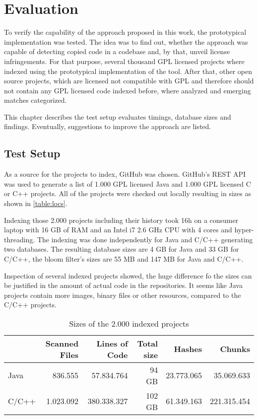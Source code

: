 
\chapter{Evaluation}\label{chapter:evaluation}
To verify the capability of the approach proposed in this work, the prototypical implementation was tested.
The idea was to find out, whether the approach was capable of detecting copied code in a codebase and, by that, unveil license infringements.
For that purpose, several thousand GPL licensed projects where indexed using the prototypical implementation of the tool.
After that, other open source projects, which are licensed not compatible with GPL and therefore should not contain any GPL licensed code indexed before, where analyzed and emerging matches categorized.

This chapter describes the test setup evaluates timings, database sizes and findings.
Eventually, suggestions to improve the approach are listed.

\section{Test Setup}
As a source for the projects to index, GitHub was chosen.
GitHub's REST API was used to generate a list of 1.000 GPL licensed Java and 1.000 GPL licensed C or C++ projects.
All of the projects were checked out locally resulting in sizes as shown in \autoref{table:locs}.

Indexing those 2.000 projects including their history took 16h on a consumer laptop with 16 GB of RAM and an Intel i7 2.6 GHz CPU with 4 cores and hyper-threading.
The indexing was done independently for Java and C/C++ generating two databases.
The resulting database sizes are 4 GB for Java and 33 GB for C/C++, the bloom filter's sizes are 55 MB and 147 MB for Java and C/C++.

Inspection of several indexed projects showed, the huge difference fo the sizes can be justified in the amount of actual code in the repositories.
It seems like Java projects contain more images, binary files or other resources, compared to the C/C++ projects.

\begin{table}[ht]
	\centering
	\begin{tabular}{l|rrrrr}
		& \textbf{Scanned Files} & \textbf{Lines of Code} & \textbf{Total size} & \textbf{Hashes} & \textbf{Chunks} \\ 
		\hline 
		Java & 836.555 & 57.834.764 & 94 GB & 23.773.065 & 35.069.633 \\
		C/C++ & 1.023.092 & 380.338.327 & 102 GB & 61.349.163 & 221.315.454 \\ 
	\end{tabular}
	\caption{Sizes of the 2.000 indexed projects}\label{table:locs}
\end{table}

